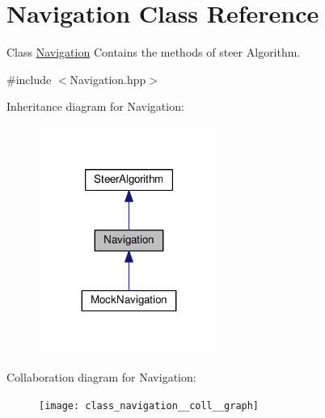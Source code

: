 \hypertarget{class_navigation}{}\section{Navigation Class Reference}
\label{class_navigation}


Class \hyperlink{class_navigation}{Navigation} Contains the methods of steer Algorithm.  




{\ttfamily \#include $<$Navigation.\+hpp$>$}



Inheritance diagram for Navigation\+:
\nopagebreak
\begin{figure}[H]
\begin{center}
\leavevmode
\includegraphics[width=167pt]{class_navigation__inherit__graph}
\end{center}
\end{figure}


Collaboration diagram for Navigation\+:
\nopagebreak
\begin{figure}[H]
\begin{center}
\leavevmode
\texttt{[image: class\_navigation\_\_coll\_\_graph]}
\end{center}
\end{figure}
